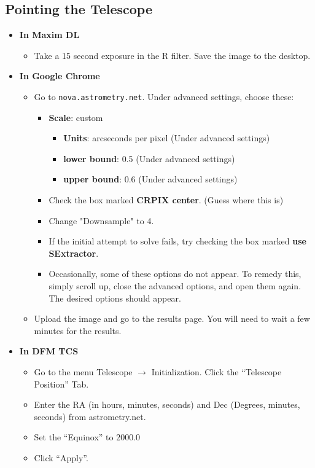 \documentclass[letterpaper, 12pt]{report}
\begin{document}
\subsection{Pointing the Telescope}
\begin{itemize}
	\item \large \textbf{In Maxim DL}
	\begin{itemize}
		\item Take a 15 second exposure in the R filter. Save the image to the desktop.
	\end{itemize}
	\item \large \textbf{In Google Chrome}
	\begin{itemize}
		\item Go to \texttt{nova.astrometry.net}. Under advanced settings, choose these:
		\begin{itemize}
			\item \textbf{Scale}: custom
			\begin{itemize}
				\item \textbf{Units}: arcseconds per pixel (Under advanced settings)
				\item \textbf{lower bound}: 0.5 (Under advanced settings)
				\item \textbf{upper bound}: 0.6 (Under advanced settings)
			\end{itemize}
			\item Check the box marked \textbf{CRPIX center}. (Guess where this is)
			\item Change "Downsample" to 4.
			\item If the initial attempt to solve fails, try checking the box marked \textbf{use SExtractor}.
			\item Occasionally, some of these options do not appear. To remedy this, simply scroll up, close the advanced options, and open them again. The desired options should appear.
		\end{itemize}
		\item Upload the image and go to the results page. You will need to wait a few minutes for the results.
	\end{itemize}
	\newpage
	\item \large \textbf{In DFM TCS}
	\begin{itemize}
		\item Go to the menu Telescope $\rightarrow$ Initialization. Click the ``Telescope Position'' Tab.
		\item Enter the RA (in hours, minutes, seconds) and Dec (Degrees, minutes, seconds) from astrometry.net.
		\item Set the ``Equinox'' to 2000.0
		\item Click ``Apply''.
	\end{itemize}
\end{itemize}
\end{document}
